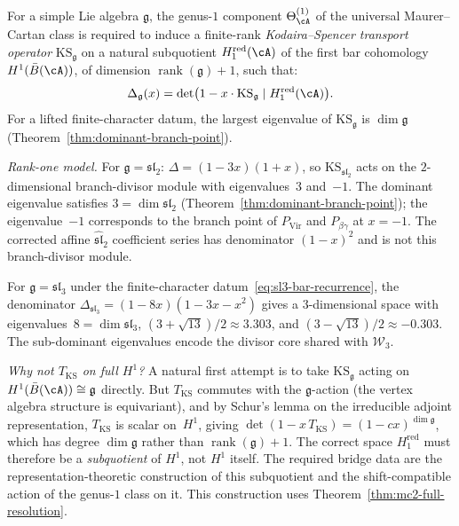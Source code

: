 \begin{hypothesis}
\label{conj:discriminant-ks-operator}
\label{hyp:discriminant-ks-operator}
For a simple Lie algebra $\mathfrak{g}$, the genus-$1$ component
$\Theta_{\cA}^{(1)}$ of the universal Maurer--Cartan class
is required to induce a finite-rank \emph{Kodaira--Spencer transport operator}
$\mathrm{KS}_{\mathfrak{g}}$ on a natural subquotient
$H^{\mathrm{red}}_1(\cA)$ of the first bar cohomology
$H^1(\bar{B}(\cA))$, of dimension
$\operatorname{rank}(\mathfrak{g}) + 1$, such that:
\begin{equation}\label{eq:discriminant-ks-operator}
\Delta_{\mathfrak{g}}(x)
= \det\bigl(1 - x \cdot \mathrm{KS}_{\mathfrak{g}}
 \mid H^{\mathrm{red}}_1(\cA)\bigr).
\end{equation}
For a lifted finite-character datum, the largest eigenvalue of
$\mathrm{KS}_{\mathfrak{g}}$ is $\dim\mathfrak{g}$
(Theorem~\ref{thm:dominant-branch-point}).

\noindent\emph{Rank-one model.}
For $\mathfrak{g} = \mathfrak{sl}_2$:
$\Delta = (1-3x)(1+x)$, so
$\mathrm{KS}_{\mathfrak{sl}_2}$
acts on the $2$-dimensional branch-divisor module with eigenvalues~$3$
and~$-1$.  The dominant eigenvalue satisfies
$3 = \dim \mathfrak{sl}_2$
(Theorem~\ref{thm:dominant-branch-point}); the
eigenvalue~$-1$ corresponds to the branch point of
$P_{\mathrm{Vir}}$ and $P_{\beta\gamma}$ at $x = -1$.
The corrected affine $\widehat{\mathfrak{sl}}_2$ coefficient series has
denominator $(1-x)^2$ and is not this branch-divisor module.

For $\mathfrak{g} = \mathfrak{sl}_3$ under the finite-character
datum~\eqref{eq:sl3-bar-recurrence}, the denominator
$\Delta_{\mathfrak{sl}_3} = (1 - 8x)(1 - 3x - x^2)$
gives a $3$-dimensional space with eigenvalues~$8 = \dim \mathfrak{sl}_3$,
$(3 {+} \sqrt{13})/2 \approx 3.303$, and
$(3 {-} \sqrt{13})/2 \approx -0.303$.
The sub-dominant eigenvalues encode the divisor core shared with
$\mathcal{W}_3$.

\emph{Why not $T_{\mathrm{KS}}$ on full $H^1$?}
A natural first attempt is to take $\mathrm{KS}_{\mathfrak{g}}$
acting on $H^1(\bar{B}(\cA)) \cong \mathfrak{g}$ directly.
But $T_{\mathrm{KS}}$ commutes with the $\mathfrak{g}$-action
(the vertex algebra structure is equivariant), and by Schur's lemma
on the irreducible adjoint representation, $T_{\mathrm{KS}}$
is scalar on~$H^1$, giving
$\det(1 - x\, T_{\mathrm{KS}}) = (1 - cx)^{\dim\mathfrak{g}}$,
which has degree $\dim\mathfrak{g}$ rather than
$\operatorname{rank}(\mathfrak{g}) + 1$.
The correct space $H^{\mathrm{red}}_1$ must
therefore be a \emph{subquotient} of $H^1$, not $H^1$ itself.
The required bridge data are the representation-theoretic construction
of this subquotient and the shift-compatible action of the genus-$1$
class on it.
This construction uses Theorem~\ref{thm:mc2-full-resolution}.
\end{hypothesis}

